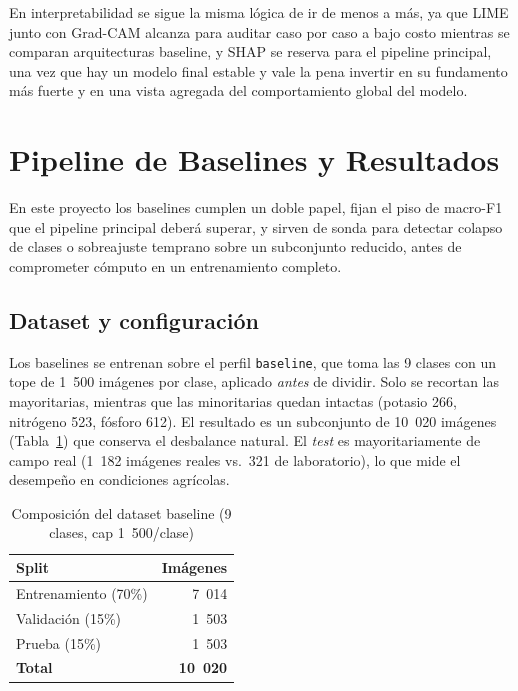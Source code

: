 \documentclass[12pt,letterpaper]{article}
\begin{document}
En interpretabilidad se sigue la misma l\'ogica de ir de menos a m\'as, ya que LIME junto con Grad-CAM alcanza para auditar caso por caso a bajo costo mientras se comparan arquitecturas baseline, y SHAP se reserva para el pipeline principal, una vez que hay un modelo final estable y vale la pena invertir en su fundamento m\'as fuerte y en una vista agregada del comportamiento global del modelo.

\section{Pipeline de Baselines y Resultados}

En este proyecto los baselines cumplen un doble papel, fijan el piso de macro-F1 que el pipeline principal deber\'a superar, y sirven de sonda para detectar colapso de clases o sobreajuste temprano sobre un subconjunto reducido, antes de comprometer c\'omputo en un entrenamiento completo.

\subsection{Dataset y configuraci\'on}

Los baselines se entrenan sobre el perfil \texttt{baseline}, que toma las 9 clases con un tope de 1~500 im\'agenes por clase, aplicado \emph{antes} de dividir. Solo se recortan las mayoritarias, mientras que las minoritarias quedan intactas (potasio 266, nitr\'ogeno 523, f\'osforo 612). El resultado es un subconjunto de 10~020 im\'agenes (Tabla~\ref{tab:baselinesplit}) que conserva el desbalance natural. El \textit{test} es mayoritariamente de campo real (1~182 im\'agenes reales vs.\ 321 de laboratorio), lo que mide el desempe\~no en condiciones agr\'icolas.

\begin{table}[H]
\caption{Composici\'on del dataset baseline (9 clases, cap 1~500/clase)}
\label{tab:baselinesplit}
\centering
\small
\begin{singlespace}
\begin{tabular}{lr}
\toprule
\textbf{Split} & \textbf{Im\'agenes} \\
\midrule
Entrenamiento (70\%) & 7~014 \\
Validaci\'on (15\%) & 1~503 \\
Prueba (15\%) & 1~503 \\
\midrule
\textbf{Total} & \textbf{10~020} \\
\bottomrule
\end{tabular}
\end{singlespace}
\end{table}
\end{document}
